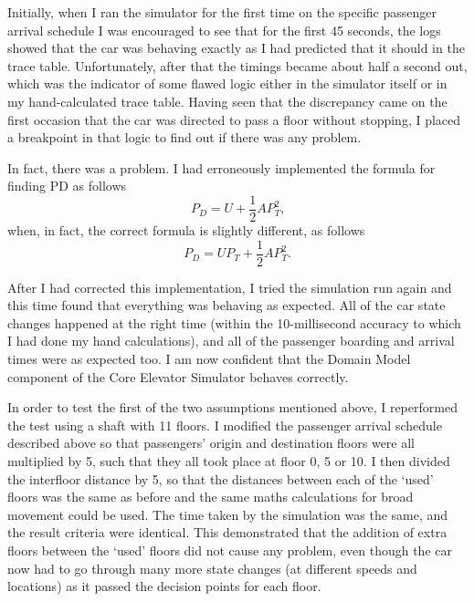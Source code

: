 \documentclass{UoYCSproject}
\begin{document}
Initially, when I ran the simulator for the first time on the specific passenger arrival schedule I was encouraged to see that for the first 45 seconds, the logs showed that the car was behaving exactly as I had predicted that it should in the trace table.  Unfortunately, after that the timings became about half a second out, which was the indicator of some flawed logic either in the simulator itself or in my hand-calculated trace table.  Having seen that the discrepancy came on the first occasion that the car was directed to pass a floor without stopping, I placed a breakpoint in that logic to find out if there was any problem.

In fact, there was a problem.  I had erroneously implemented the formula for finding PD as follows
\[ P_D = U + \frac{1}{2}AP_T^2 \text{,} \]
when, in fact, the correct formula is slightly different, as follows
\[ P_D = UP_T + \frac{1}{2}AP_T^2 \text{.} \]

After I had corrected this implementation, I tried the simulation run again and this time found that everything was behaving as expected.  All of the car state changes happened at the right time (within the 10-millisecond accuracy to which I had done my hand calculations), and all of the passenger boarding and arrival times were as expected too.  I am now confident that the Domain Model component of the Core Elevator Simulator behaves correctly.

In order to test the first of the two assumptions mentioned above, I reperformed the test using a shaft with 11 floors.  I modified the passenger arrival schedule described above so that passengers' origin and destination floors were all multiplied by 5, such that they all took place at floor 0, 5 or 10.  I then divided the interfloor distance by 5, so that the distances between each of the `used' floors was the same as before and the same maths calculations for broad movement could be used.  The time taken by the simulation was the same, and the result criteria were identical.  This demonstrated that the addition of extra floors between the `used' floors did not cause any problem, even though the car now had to go through many more state changes (at different speeds and locations) as it passed the decision points for each floor.
\end{document}
